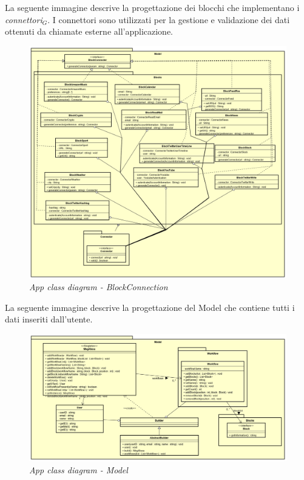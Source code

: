\newpage
La seguente immagine descrive la progettazione dei blocchi che implementano i \textit{connettori$_{G}$}.
I connettori sono utilizzati per la gestione e validazione dei dati ottenuti da chiamate esterne all'applicazione.
\begin{figure} [H]
	\centering
	\includegraphics[scale=0.3]{./images/BlockConnection.png}
	\caption{\textit{App class diagram - BlockConnection}}\label{BlockConnection}
\end{figure}
\newpage
La seguente immagine descrive la progettazione del Model che contiene tutti i dati inseriti dall'utente.
\begin{figure} [H]
	\centering
	\includegraphics[scale=0.3]{./images/Model.png}
	\caption{\textit{App class diagram - Model}}\label{Model}
\end{figure}